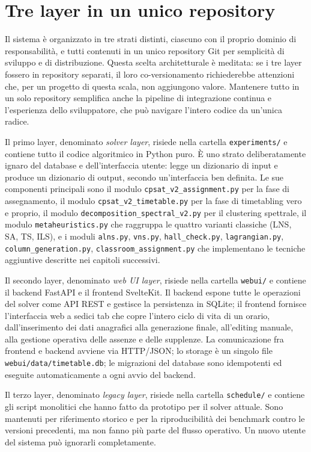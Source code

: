 \section{Tre layer in un unico repository}

Il sistema \`e organizzato in tre strati distinti, ciascuno
con il proprio dominio di responsabilit\`a, e tutti contenuti
in un unico repository Git per semplicit\`a di sviluppo e di
distribuzione. Questa scelta architetturale \`e meditata: se
i tre layer fossero in repository separati, il loro
co-versionamento richiederebbe attenzioni che, per un
progetto di questa scala, non aggiungono valore. Mantenere
tutto in un solo repository semplifica anche la pipeline di
integrazione continua e l'esperienza dello sviluppatore, che
pu\`o navigare l'intero codice da un'unica radice.

Il primo layer, denominato \emph{solver layer}, risiede nella
cartella \texttt{experiments/} e contiene tutto il codice
algoritmico in Python puro. \`E uno strato deliberatamente
ignaro del database e dell'interfaccia utente: legge un
dizionario di input e produce un dizionario di output,
secondo un'interfaccia ben definita. Le sue componenti
principali sono il modulo \texttt{cpsat\_v2\_assignment.py}
per la fase di assegnamento, il modulo
\texttt{cpsat\_v2\_timetable.py} per la fase di timetabling
vero e proprio, il modulo
\texttt{decomposition\_spectral\_v2.py} per il clustering
spettrale, il modulo \texttt{metaheuristics.py} che
raggruppa le quattro varianti classiche (LNS, SA, TS, ILS),
e i moduli \texttt{alns.py}, \texttt{vns.py},
\texttt{hall\_check.py}, \texttt{lagrangian.py},
\texttt{column\_generation.py}, \texttt{classroom\_assignment.py}
che implementano le tecniche aggiuntive descritte nei
capitoli successivi.

Il secondo layer, denominato \emph{web UI layer}, risiede
nella cartella \texttt{webui/} e contiene il backend FastAPI
e il frontend SvelteKit. Il backend espone tutte le
operazioni del solver come API REST e gestisce la
persistenza in SQLite; il frontend fornisce l'interfaccia
web a sedici tab che copre l'intero ciclo di vita di un
orario, dall'inserimento dei dati anagrafici alla generazione
finale, all'editing manuale, alla gestione operativa delle
assenze e delle supplenze. La comunicazione fra frontend e
backend avviene via HTTP/JSON; lo storage \`e un singolo file
\texttt{webui/data/timetable.db}; le migrazioni del database
sono idempotenti ed eseguite automaticamente a ogni avvio
del backend.

Il terzo layer, denominato \emph{legacy layer}, risiede nella
cartella \texttt{schedule/} e contiene gli script monolitici
che hanno fatto da prototipo per il solver attuale. Sono
mantenuti per riferimento storico e per la riproducibilit\`a
dei benchmark contro le versioni precedenti, ma non fanno pi\`u
parte del flusso operativo. Un nuovo utente del sistema pu\`o
ignorarli completamente.

